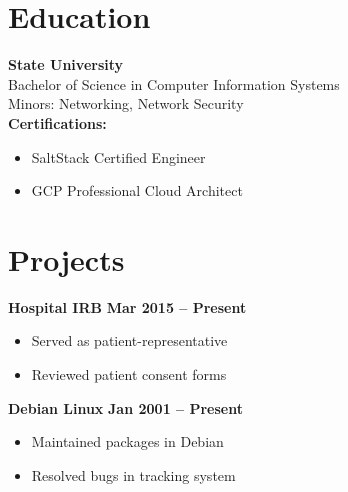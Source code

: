 \documentclass[letterpaper,10pt]{article}
\newenvironment{resumelist}{
  \begin{itemize}[leftmargin=*, itemsep=-2pt]
}{
  \end{itemize}
}
\begin{document}
\section{Education}
\textbf{State University} \hfill \textbf{}\\
Bachelor of Science in Computer Information Systems \hfill \\
Minors: Networking, Network Security \hfill \\

\vspace{5pt}
\textbf{Certifications:}
\begin{resumelist}
  \item SaltStack Certified Engineer
  \item GCP Professional Cloud Architect
\end{resumelist}

\section{Projects}
\textbf{Hospital IRB} \hfill \textbf{Mar 2015 -- Present}
\begin{resumelist}
  \item Served as patient-representative
  \item Reviewed patient consent forms
\end{resumelist}

\textbf{Debian Linux} \hfill \textbf{Jan 2001 -- Present}
\begin{resumelist}
  \item Maintained packages in Debian
  \item Resolved bugs in tracking system
\end{resumelist}
\end{document}
